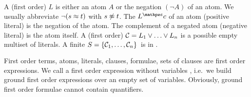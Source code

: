 
\begin{definition}[\CNF]
A (first order)  \( L \) is either an atom \( A \) or the negation
\( (\lnot A) \) of an atom. We usually abbreviate \( \lnot(s\approx t) \) with \( s\not\approx t \).
%
The  \( L^\mcc \) of an atom (positive literal) is the negation of the atom.
The complement of a negated atom (negative literal) is the atom itself.
A (first order)  \( \mathcal{C} = L_1\lor\ldots\lor L_n \)  is a possible empty multiset of literals.
A finite  \( S=\{ \mathcal{C}_1,\ldots,\mathcal{C}_n \} \) is in .
\end{definition}

\begin{remark}
	First order terms, atoms, literals, clauses, formulae, sets of clauses
	are first order expressions.
	We call a first order expression without variables ,
	i.e.\ we build ground first order expressions over an empty set of variables.
	Obviously, ground first order formulae cannot contain quantifiers.
\end{remark}



